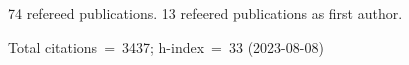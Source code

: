 74 refereed publications. 13 refeered publications as first author.

Total citations~=~3437; h-index~=~33 (2023-08-08)
